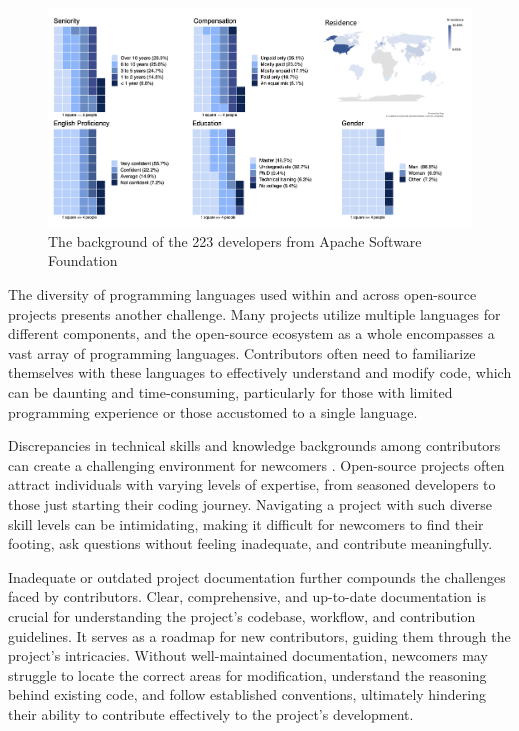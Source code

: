 \begin{figure}[ht]
    \centering
    \includegraphics[width=1\linewidth]{figs/contributor_background.png}
    \caption{The background of the 223 developers from Apache Software Foundation \cite{04guizani2021long}}
    \label{fig:contributor_background}
\end{figure}

The diversity of programming languages used within and across open-source projects presents another challenge. Many projects utilize multiple languages for different components, and the open-source ecosystem as a whole encompasses a vast array of programming languages. Contributors often need to familiarize themselves with these languages to effectively understand and modify code, which can be daunting and time-consuming, particularly for those with limited programming experience or those accustomed to a single language.

Discrepancies in technical skills and knowledge backgrounds among contributors can create a challenging environment for newcomers \cite{01steinmacher2015systematic}. Open-source projects often attract individuals with varying levels of expertise, from seasoned developers to those just starting their coding journey. Navigating a project with such diverse skill levels can be intimidating, making it difficult for newcomers to find their footing, ask questions without feeling inadequate, and contribute meaningfully.

Inadequate or outdated project documentation further compounds the challenges faced by contributors. Clear, comprehensive, and up-to-date documentation is crucial for understanding the project's codebase, workflow, and contribution guidelines. It serves as a roadmap for new contributors, guiding them through the project's intricacies. Without well-maintained documentation, newcomers may struggle to locate the correct areas for modification, understand the reasoning behind existing code, and follow established conventions, ultimately hindering their ability to contribute effectively to the project's development.



